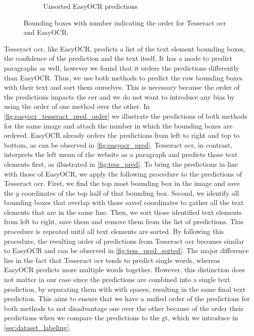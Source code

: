 \begin{figure}
\begin{subfigure}[b]{0.45\textwidth}
        \caption{Unsorted EasyOCR predictions}
        \label{fig:easyocr_pred}
    \end{subfigure}
    \hfill
    \caption{Bounding boxes with number indicating the order for Tesseract \gls{ocr} and EasyOCR.}
    \label{fig:easyocr_tesseract_pred_order}
\end{figure}

Tesseract \gls{ocr}, like EasyOCR, predicts a list of the text element bounding boxes, the confidence of the prediction and the text itself.
It has a mode to predict paragraphs as well, however we found that it orders the predictions differently than EasyOCR.
Thus, we use both methods to predict the raw bounding boxes with their text and sort them ourselves.
This is necessary because the order of the predictions impacts the \gls{cer} and we do not want to introduce any bias by using the order of one method over the other.
In \autoref{fig:easyocr_tesseract_pred_order} we illustrate the predictions of both methods for the same image and attach the number in which the bounding boxes are ordered.
EasyOCR already orders the predictions from left to right and top to bottom, as can be observed in \autoref{fig:easyocr_pred}.
Tesseract \gls{ocr}, in contrast, interprets the left menu of the website as a paragraph and predicts those text elements first, as illustrated in \autoref{fig:tess_pred}.
To bring the predictions in line with those of EasyOCR, we apply the following procedure to the predictions of Tesseract \gls{ocr}.
First, we find the top most bounding box in the image and save the $y$ coordinates of the top half of that bounding box.
Second, we identify all bounding boxes that overlap with those saved coordinates to gather all the text elements that are in the same line.
Then, we sort those identified text elements from left to right, save them and remove them from the list of predictions.
This procedure is repeated until all text elements are sorted.
By following this procedure, the resulting order of predictions from Tesseract \gls{ocr} becomes similar to EasyOCR and can be observed in \autoref{fig:tess_pred_sorted}.
The major difference lies in the fact that Tesseract \gls{ocr} tends to predict single words, whereas EasyOCR predicts more multiple words together.
However, this distinction does not matter in our case since the predictions are combined into a single text prediction, by separating them with with spaces, resulting in the same final text prediction.
This aims to ensure that we have a unified order of the predictions for both methods to not disadvantage one over the other because of the order their predictions when we compare the predictions to the \gls{gt}, which we introduce in \autoref{sec:dataset_labeling}.

